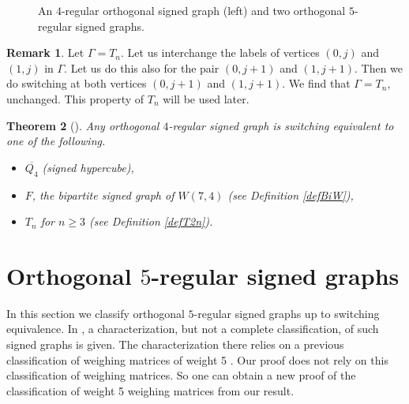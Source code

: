 \documentclass[11pt]{article}
\theoremstyle{plain}
\newtheorem{theorem}{Theorem}[section]
\theoremstyle{definition}
\newtheorem{remark}[theorem]{Remark}
\begin{document}
\begin{figure}
    \caption{An $4$-regular orthogonal signed graph (left) and two orthogonal $5$-regular signed graphs.}
    \label{fig:T,TP,TS}
\end{figure}

\begin{remark}\label{remT2n}
Let $\Gamma=T_{n}$. Let us interchange the labels of vertices $(0,j)$ and $(1,j)$ in $\Gamma$. Let us do this also for the pair $(0,j+1)$ and $(1,j+1)$.
Then we do switching  at both vertices $(0,j+1)$ and $(1,j+1)$.  We find that  $\Gamma=T_{n}$, unchanged. This property of  $T_{n}$ will be used later.
\end{remark}



\begin{theorem}[\cite{Gh,Ho,MK}]\label{4reg}
Any orthogonal $4$-regular signed graph is switching equivalent to one of the following.
\begin{itemize}
\item[$(1)$] $\overline{Q_4}$ (signed hypercube),
\item[$(2)$] $F$, the bipartite signed graph of $W(7,4)$ (see Definition \ref{defBiW}),
\item[$(3)$] $T_{n}$ for $n\geqslant 3$  (see Definition \ref{defT2n}).
\end{itemize}
\end{theorem}



\section{Orthogonal $5$-regular signed graphs}\label{Sec:k=5}
In this section  we classify orthogonal $5$-regular signed graphs up to switching equivalence.
In \cite{St}, a characterization, but not a complete classification,  of such signed graphs is given. The characterization there relies on a previous classification of weighing matrices of weight 5 \cite{CRS86,HM12}. Our proof does not rely on this classification of weighing matrices. So one can obtain a new proof of the classification of weight 5 weighing matrices from our result.
\end{document}
